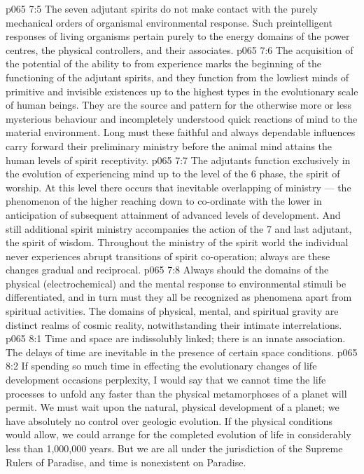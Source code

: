 \vs p065 7:5 The seven adjutant spirits do not make contact with the purely mechanical orders of organismal environmental response. Such preintelligent responses of living organisms pertain purely to the energy domains of the power centres, the physical controllers, and their associates.
\vs p065 7:6 The acquisition of the potential of the ability to  from experience marks the beginning of the functioning of the adjutant spirits, and they function from the lowliest minds of primitive and invisible existences up to the highest types in the evolutionary scale of human beings. They are the source and pattern for the otherwise more or less mysterious behaviour and incompletely understood quick reactions of mind to the material environment. Long must these faithful and always dependable influences carry forward their preliminary ministry before the animal mind attains the human levels of spirit receptivity.
\vs p065 7:7 The adjutants function exclusively in the evolution of experiencing mind up to the level of the 6 phase, the spirit of worship. At this level there occurs that inevitable overlapping of ministry --- the phenomenon of the higher reaching down to co\hyp{}ordinate with the lower in anticipation of subsequent attainment of advanced levels of development. And still additional spirit ministry accompanies the action of the 7 and last adjutant, the spirit of wisdom. Throughout the ministry of the spirit world the individual never experiences abrupt transitions of spirit co\hyp{}operation; always are these changes gradual and reciprocal.
\vs p065 7:8 Always should the domains of the physical (electrochemical) and the mental response to environmental stimuli be differentiated, and in turn must they all be recognized as phenomena apart from spiritual activities. The domains of physical, mental, and spiritual gravity are distinct realms of cosmic reality, notwithstanding their intimate interrelations.
\vs p065 8:1 Time and space are indissolubly linked; there is an innate association. The delays of time are inevitable in the presence of certain space conditions.
\vs p065 8:2 If spending so much time in effecting the evolutionary changes of life development occasions perplexity, I would say that we cannot time the life processes to unfold any faster than the physical metamorphoses of a planet will permit. We must wait upon the natural, physical development of a planet; we have absolutely no control over geologic evolution. If the physical conditions would allow, we could arrange for the completed evolution of life in considerably less than 1,000,000 years. But we are all under the jurisdiction of the Supreme Rulers of Paradise, and time is nonexistent on Paradise.
